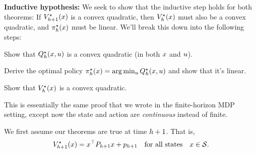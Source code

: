 \documentclass[../main/main]{subfiles}
\begin{document}
\textbf{Inductive hypothesis:} We seek to show that the inductive step holds for both theorems: If $V^\star_{h+1}(x)$ is a convex quadratic, then $V^\star_h(x)$ must also be a convex quadratic, and $\pi^\star_h(x)$ must be linear. We'll break this down into the following steps:
\begin{steps}
    \item Show that $Q^\star_h(x, u)$ is a convex quadratic (in both $x$ and $u$).
    \item Derive the optimal policy $\pi^\star_h(x) = \arg \min_u Q^\star_h(x, u)$ and show that it's linear.
    \item Show that $V^\star_h(x)$ is a convex quadratic.
\end{steps}
This is essentially the same proof that we wrote in the finite-horizon MDP setting,
except now the state and action are \emph{continuous} instead of finite.

We first assume our theorems are true at time $h+1$. That is,
\[ V^\star_{h+1}(x) = x^\top P_{h+1} x + p_{h+1} \quad \text{for all states} \quad x \in \mathcal{S}. \]
\end{document}
